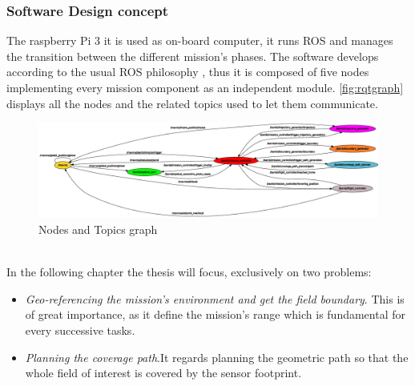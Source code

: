  \subsubsection{Software Design concept} %
 \label{ssub:software_design}
 The raspberry Pi 3 it is used as on-board computer, it runs ROS and manages the transition between the different mission's phases. The software develops according to the usual ROS philosophy \cite{288}, thus it is composed of five nodes implementing every mission component as an independent module. \autoref{fig:rqtgraph} displays all the nodes and the related topics used to let them communicate.
\begin{figure}[ht]
    \centering
    \includegraphics[width=1.4\textwidth, angle=270]{figures/C1/rqtgraph.eps}
    \caption{Nodes and Topics graph}
    \label{fig:rqtgraph}
\end{figure}\\
 In the following chapter the thesis will focus, exclusively on two problems:
 \begin{itemize}
  	\item \textit{Geo-referencing the mission's environment and get the field boundary}. This is of great importance, as it define the mission's range which is fundamental for every successive tasks.
  	\item \textit{Planning the coverage path}.It regards planning the geometric path so that the whole field of interest is covered by the sensor footprint.
  \end{itemize}

 



